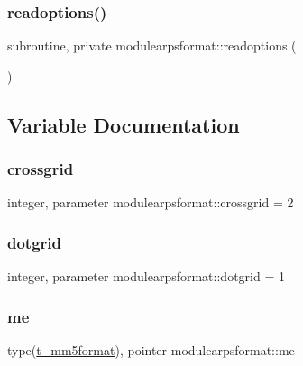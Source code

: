 \subsubsection{\texorpdfstring{readoptions()}{readoptions()}}
{\footnotesize\ttfamily subroutine, private modulearpsformat\+::readoptions (\begin{DoxyParamCaption}{ }\end{DoxyParamCaption})\hspace{0.3cm}{\ttfamily [private]}}



\subsection{Variable Documentation}
\mbox{\label{namespacemodulearpsformat_a481f4077f9a97ca259535ae7940a069d}} 
\subsubsection{\texorpdfstring{crossgrid}{crossgrid}}
{\footnotesize\ttfamily integer, parameter modulearpsformat\+::crossgrid = 2\hspace{0.3cm}{\ttfamily [private]}}

\mbox{\label{namespacemodulearpsformat_adad659745a61e1b477c5b8218c0a518b}} 
\subsubsection{\texorpdfstring{dotgrid}{dotgrid}}
{\footnotesize\ttfamily integer, parameter modulearpsformat\+::dotgrid = 1\hspace{0.3cm}{\ttfamily [private]}}

\mbox{\label{namespacemodulearpsformat_aa48b8d20bd8a9748703bc70c33e5bce9}} 
\subsubsection{\texorpdfstring{me}{me}}
{\footnotesize\ttfamily type(\mbox{\hyperlink{structmodulearpsformat_1_1t__mm5format}{t\+\_\+mm5format}}), pointer modulearpsformat\+::me\hspace{0.3cm}{\ttfamily [private]}}

